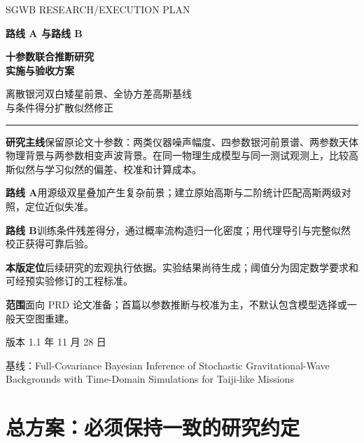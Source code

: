 \documentclass[UTF8,fontset=none,a4paper,11pt]{ctexart}
\newcommand{\chapterpage}[1]{\section{#1}}
\begin{document}
\begin{titlepage}
\centering\vspace*{17mm}
{\small\color{deep}SGWB RESEARCH\quad /\quad EXECUTION PLAN}\par\vspace{12mm}
{\Huge\bfseries 路线 A 与路线 B}\par\vspace{6mm}
{\LARGE\bfseries 十参数联合推断研究\\[5pt]实施与验收方案}\par\vspace{12mm}
{\large 离散银河双白矮星前景、全协方差高斯基线\\[5pt]与条件得分扩散似然修正}\par\vspace{14mm}
\rule{\linewidth}{0.7pt}\par\vspace{4mm}
\begin{minipage}{0.91\linewidth}
\textbf{研究主线}\quad 保留原论文十参数：两类仪器噪声幅度、四参数银河前景谱、两参数天体物理背景与两参数相变声波背景。在同一物理生成模型与同一测试观测上，比较高斯似然与学习似然的偏差、校准和计算成本。\par
\textbf{路线 A}\quad 用源级双星叠加产生复杂前景；建立原始高斯与二阶统计匹配高斯两级对照，定位近似失准。\par
\textbf{路线 B}\quad 训练条件残差得分，通过概率流构造归一化密度；用代理导引与完整似然校正获得可靠后验。\par
\textbf{本版定位}\quad 后续研究的宏观执行依据。实验结果尚待生成；阈值分为固定数学要求和可经预实验修订的工程标准。\par
\textbf{范围}\quad 面向 PRD 论文准备；首篇以参数推断与校准为主，不默认包含模型选择或一般天空图重建。
\end{minipage}\par\vfill
{\large 版本 1.1 年 11 月 28 日}\par\vspace{3mm}
{\small 基线：Full-Covariance Bayesian Inference of Stochastic Gravitational-Wave\\ Backgrounds with Time-Domain Simulations for Taiji-like Missions}
\end{titlepage}
{\small\tableofcontents}\clearpage
\chapterpage{总方案：必须保持一致的研究约定}
\end{document}
